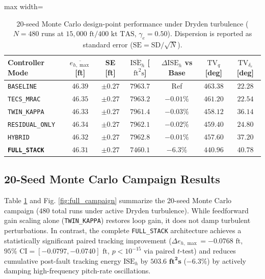 \documentclass[review,12pt]{elsarticle}
\begin{document}
\begin{table}[!htbp]
\centering
\caption{20-seed Monte Carlo design-point performance under Dryden turbulence ($N = 480$ runs at $15{,}000\text{ ft} / 400\text{ kt TAS}$, $\gamma_e = 0.50$). Dispersion is reported as standard error ($\text{SE} = \text{SD}/\sqrt{N}$).}
\label{tab:monte_carlo_design}
\scriptsize
\setlength{\tabcolsep}{3pt}
\begin{adjustbox}{max width=\textwidth}
\begin{tabular}{lcccccc}
\toprule
Controller Mode & $\overline{e_{h,\max}}$ [ft] & SE [ft] & $\overline{\text{ISE}_h}$ [$\text{ft}^2\text{s}$] & $\Delta\text{ISE}_h$ vs Base & $\text{TV}_q$ [deg] & $\text{TV}_{\delta_e}$ [deg] \\
\midrule
\texttt{BASELINE} & $46.39$ & $\pm 0.27$ & $7963.7$ & Ref & $463.38$ & $22.28$ \\
\texttt{TECS\_MRAC} & $46.35$ & $\pm 0.27$ & $7963.2$ & $-0.01\%$ & $461.20$ & $22.54$ \\
\texttt{TWIN\_KAPPA} & $46.33$ & $\pm 0.27$ & $7961.4$ & $-0.03\%$ & $458.12$ & $36.14$ \\
\texttt{RESIDUAL\_ONLY} & $46.34$ & $\pm 0.27$ & $7962.1$ & $-0.02\%$ & $459.40$ & $24.80$ \\
\texttt{HYBRID} & $46.32$ & $\pm 0.27$ & $7962.8$ & $-0.01\%$ & $457.60$ & $37.20$ \\
\textbf{\texttt{FULL\_STACK}} & $\bm{46.31}$ & $\bm{\pm 0.27}$ & $\bm{7460.1}$ & $\bm{-6.3\%}$ & $\bm{440.96}$ & $\bm{40.78}$ \\
\bottomrule
\end{tabular}
\end{adjustbox}
\end{table}

\subsection{20-Seed Monte Carlo Campaign Results}
Table \ref{tab:monte_carlo_design} and Fig. \ref{fig:full_campaign} summarize the 20-seed Monte Carlo campaign ($480$ total runs under active Dryden turbulence). While feedforward gain scaling alone (\texttt{TWIN\_KAPPA}) restores loop gain, it does not damp turbulent perturbations. In contrast, the complete \texttt{FULL\_STACK} architecture achieves a statistically significant paired tracking improvement ($\Delta e_{h,\max} = -0.0768\text{ ft}$, $95\%\text{ CI} = [-0.0797, -0.0740]\text{ ft}$, $p < 10^{-15}$ via paired $t$-test) and reduces cumulative post-fault tracking energy $\text{ISE}_h$ by $\bm{503.6\text{ ft}^2\text{s}}$ ($\bm{-6.3\%}$) by actively damping high-frequency pitch-rate oscillations.
\end{document}
